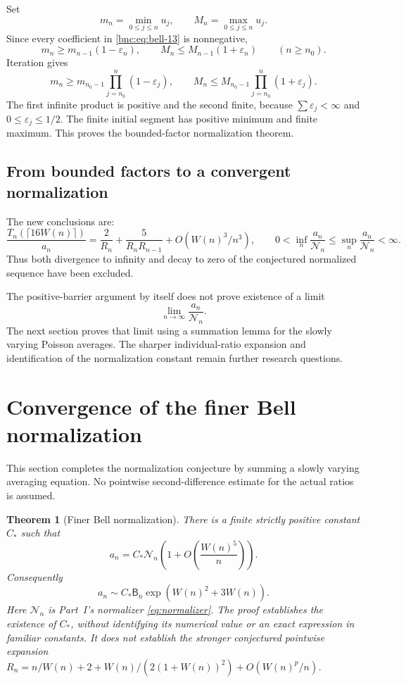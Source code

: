 \documentclass[11pt]{article}
\numberwithin{equation}{section}
\newtheorem{theorem}{Theorem}[section]
\theoremstyle{definition}
\theoremstyle{remark}
\begin{document}
Set
\[
 m_n=\min_{0\le j\le n}u_j,\qquad
 M_n=\max_{0\le j\le n}u_j.
\]
Since every coefficient in \eqref{bnc:eq:bell-13} is nonnegative,
\[
 m_n\ge m_{n-1}(1-\varepsilon_n),
 \qquad
 M_n\le M_{n-1}(1+\varepsilon_n)
 \qquad(n\ge n_0).
\]
Iteration gives
\[
 m_n\ge m_{n_0-1}
       \prod_{j=n_0}^{n}(1-\varepsilon_j),\qquad
 M_n\le M_{n_0-1}
       \prod_{j=n_0}^{n}(1+\varepsilon_j).
\]
The first infinite product is positive and the second finite, because
\(\sum\varepsilon_j<\infty\) and \(0\le\varepsilon_j\le1/2\).
The finite initial segment has positive minimum and finite maximum.
This proves the bounded-factor normalization theorem.

\subsection{From bounded factors to a convergent normalization}

The new conclusions are:
\[
 \frac{T_n(\lceil16W(n)\rceil)}{a_n}
 =\frac2{R_n}+\frac5{R_nR_{n-1}}+O(W(n)^3/n^3),
 \qquad
 0<\inf_n\frac{a_n}{\mathcal N_n}
       \le\sup_n\frac{a_n}{\mathcal N_n}<\infty.
\]
Thus both divergence to infinity and decay to zero of the conjectured
normalized sequence have been excluded.

The positive-barrier argument by itself does not prove existence of a limit
\[
 \lim_{n\to\infty}\frac{a_n}{\mathcal N_n}.
\]
The next section proves that limit using a summation lemma for the
slowly varying Poisson averages.  The sharper individual-ratio expansion
and identification of the normalization constant remain further
research questions.


\section{Convergence of the finer Bell normalization}\label{bnc:sec:bellconvergence}

This section completes the normalization conjecture by summing a
slowly varying averaging equation.  No pointwise second-difference
estimate for the actual ratios is assumed.

\begin{theorem}[Finer Bell normalization]\label{bnc:thm:bell}
There is a finite strictly positive constant \(C_*\) such that
\[
 \boxed{
 a_n=C_*\mathcal N_n
      \left(1+O\!\left(\frac{W(n)^5}{n}\right)\right).}
\]
Consequently
\[
 \boxed{
 a_n\sim C_*\mathsf B_n\exp(W(n)^2+3W(n)).}
\]
Here \(\mathcal N_n\) is Part~I's normalizer \eqref{eq:normalizer}.
The proof establishes the existence of \(C_*\), without identifying its
numerical value or an exact expression in familiar constants.
It does not establish the stronger conjectured pointwise expansion
\(R_n=n/W(n)+2+W(n)/(2(1+W(n))^2)
+O(W(n)^p/n)\).
\end{theorem}
\end{document}
